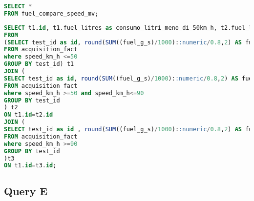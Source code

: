\begin{lstlisting}[language=SQL]
SELECT *
FROM fuel_compare_speed_mv;
\end{lstlisting}
\begin{lstlisting}[language=SQL]
SELECT t1.id, t1.fuel_litres as consumo_litri_meno_di_50km_h, t2.fuel_litres as consumo_litri_meno_di_90km_h, t3.fuel_litres as consumo_litri_meno_di_130km_h
FROM
(SELECT test_id as id, round(SUM((fuel_g_s)/1000)::numeric/0.8,2) AS fuel_litres, round(AVG(velocity_km_h)::numeric,1) as average_speed_km_h
FROM acquisition_fact
where speed_km_h <=50
GROUP BY test_id) t1
JOIN (
SELECT test_id as id, round(SUM((fuel_g_s)/1000)::numeric/0.8,2) AS fuel_litres, round(AVG(velocity_km_h)::numeric,1) as average_speed_km_h
FROM acquisition_fact
where speed_km_h >=50 and speed_km_h<=90
GROUP BY test_id
) t2
ON t1.id=t2.id
JOIN (
SELECT test_id as id , round(SUM((fuel_g_s)/1000)::numeric/0.8,2) AS fuel_litres, round(AVG(velocity_km_h)::numeric,1) as average_speed_km_h
FROM acquisition_fact
where speed_km_h >=90
GROUP BY test_id
)t3
ON t1.id=t3.id;
\end{lstlisting}

\subsection{Query E}
